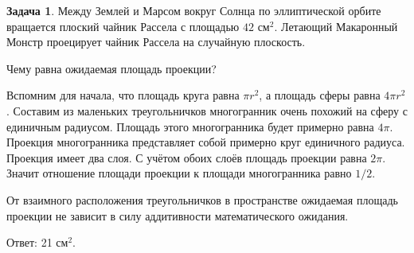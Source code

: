 \documentclass[nobib]{tufte-handout}
\theoremstyle{definition}
\newtheorem{problem}{Задача}
\begin{document}
\begin{problem}
Между Землей и Марсом вокруг Солнца по эллиптической орбите вращается плоский чайник Рассела с площадью $42$ см$^2$. Летающий Макаронный Монстр проецирует чайник Рассела на случайную плоскость.

Чему равна ожидаемая площадь проекции?
\begin{sol}
Вспомним для начала, что площадь круга равна $\pi r^2$, а площадь сферы равна $4\pi r^2$. Составим из маленьких треугольничков многогранник очень похожий на сферу с единичным радиусом. Площадь этого многогранника будет примерно равна $4\pi$. Проекция многогранника представляет собой примерно круг единичного радиуса. Проекция имеет два слоя. С учётом обоих слоёв площадь проекции равна $2\pi$. Значит отношение площади проекции к площади многогранника равно $1/2$.

От взаимного расположения треугольничков в пространстве ожидаемая площадь проекции не зависит в силу аддитивности математического ожидания.

Ответ: 21 см$^2$.
\end{sol}

\end{problem}
\end{document}

